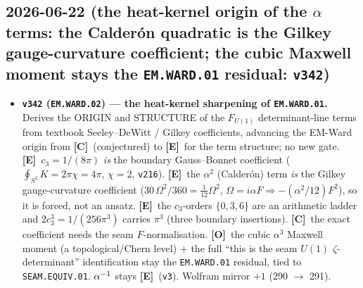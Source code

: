 \documentclass[11pt]{article}
\providecommand{\mE}{\textbf{[E]}}\providecommand{\mC}{\textbf{[C]}}
\providecommand{\mO}{\textbf{[O]}}\providecommand{\mX}{\textbf{[X]}}
\providecommand{\vref}[1]{\texttt{#1}}
\providecommand{\cthree}{c_3}\providecommand{\phiz}{\varphi_0^{\mathrm{ret}}}
\begin{document}
\subsection*{2026-06-22 (the heat-kernel origin of the $\alpha$ terms: the Calder\'on quadratic is the Gilkey gauge-curvature coefficient; the cubic Maxwell moment stays the \texttt{EM.WARD.01} residual: \texttt{v342})}
\begin{itemize}
\item \textbf{\texttt{v342} (\texttt{EM.WARD.02}) --- the heat-kernel sharpening of \texttt{EM.WARD.01}.} Derives the
ORIGIN and STRUCTURE of the $F_{U(1)}$ determinant-line terms from textbook Seeley--DeWitt / Gilkey coefficients,
advancing the EM-Ward origin from \mC\ (conjectured) to \mE\ for the term structure; no new gate. \mE\ $\cthree=
1/(8\pi)$ \emph{is} the boundary Gauss--Bonnet coefficient ($\oint_{S^2}K=2\pi\chi=4\pi$, $\chi{=}2$, \vref{v216}).
\mE\ the $\alpha^2$ (Calder\'on) term \emph{is} the Gilkey gauge-curvature coefficient ($30\,\Omega^2/360=\tfrac1{12}
\Omega^2$, $\Omega{=}i\alpha F\Rightarrow-(\alpha^2/12)F^2$), so it is forced, not an ansatz. \mE\ the $\cthree$-orders
$\{0,3,6\}$ are an arithmetic ladder and $2\cthree^3=1/(256\pi^3)$ carries $\pi^3$ (three boundary insertions). \mC\
the exact coefficient needs the seam $F$-normalisation. \mO\ the cubic $\alpha^3$ Maxwell moment (a topological/Chern
level) $+$ the full ``this is the seam $U(1)$ $\zeta$-determinant'' identification stay the \texttt{EM.WARD.01}
residual, tied to \texttt{SEAM.EQUIV.01}. $\alpha^{-1}$ stays \mE\ (\vref{v3}). Wolfram mirror $+1$ (290 $\to$ 291).
\end{itemize}
\end{document}
